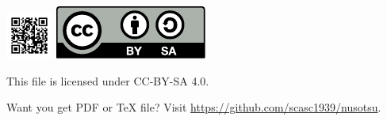 \documentclass[
    10pt,
    ]{sotsu-beamer}
\begin{document}
\begin{frame}

    \begin{center}
        \normalsize
        \includegraphics[width=0.2\linewidth]{../misc/github_url.pdf}
        \hspace{0.1\linewidth}
        \includegraphics[width=0.3\linewidth]{../misc/cc-by-sa.pdf}

        This file is licensed under CC-BY-SA 4.0.

        Want you get PDF or \TeX{} file?
        Visit \url{https://github.com/scasc1939/nusotsu}.
    \end{center}

\end{frame}
\end{document}
